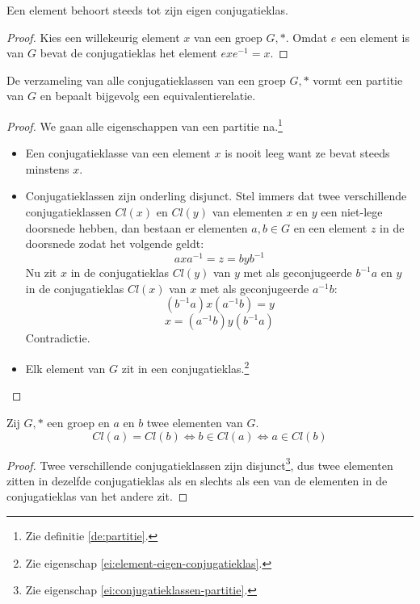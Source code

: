 \documentclass[main.tex]{subfiles}
\begin{document}
\begin{ei}
  \label{ei:element-eigen-conjugatieklas}
  Een element behoort steeds tot zijn eigen conjugatieklas.

  \begin{proof}
    Kies een willekeurig element $x$ van een groep $G,*$.
    Omdat $e$ een element is van $G$ bevat de conjugatieklas het element $exe^{-1} = x$.
  \end{proof}
\end{ei}

\begin{ei}
  \label{ei:conjugatieklassen-partitie}
  De verzameling van alle conjugatieklassen van een groep $G,*$ vormt een partitie van $G$ en bepaalt bijgevolg een equivalentierelatie.
  \begin{proof}
    We gaan alle eigenschappen van een partitie na.\footnote{Zie definitie \ref{de:partitie}.}
    \begin{itemize}
    \item Een conjugatieklasse van een element $x$ is nooit leeg want ze bevat steeds minstens $x$.
    \item Conjugatieklassen zijn onderling disjunct.
      Stel immers dat twee verschillende conjugatieklassen $Cl(x)$ en $Cl(y)$ van elementen $x$ en $y$ een niet-lege doorsnede hebben, dan bestaan er elementen $a,b \in G$ en een element $z$ in de doorsnede zodat het volgende geldt:
      \[ axa^{-1} = z = byb^{-1} \]
      Nu zit $x$ in de conjugatieklas $Cl(y)$ van $y$ met als geconjugeerde $b^{-1}a$ en $y$ in de conjugatieklas $Cl(x)$ van $x$ met als geconjugeerde $a^{-1}b$:
      \[ (b^{-1}a)x(a^{-1}b) = y \]
      \[ x = (a^{-1}b) y(b^{-1}a) \]
      Contradictie.
    \item Elk element van $G$ zit in een conjugatieklas.\footnote{Zie eigenschap \ref{ei:element-eigen-conjugatieklas}.}
    \end{itemize}
  \end{proof}
\end{ei}

\begin{st}
  Zij $G,*$ een groep en $a$ en $b$ twee elementen van $G$.
  \[ Cl(a) = Cl(b) \Leftrightarrow b \in Cl(a) \Leftrightarrow a \in Cl(b) \]

  \begin{proof}
    Twee verschillende conjugatieklassen zijn disjunct\footnote{Zie eigenschap \ref{ei:conjugatieklassen-partitie}.}, dus twee elementen zitten in dezelfde conjugatieklas als en slechts als een van de elementen in de conjugatieklas van het andere zit.
  \end{proof}
\end{st}
\end{document}
